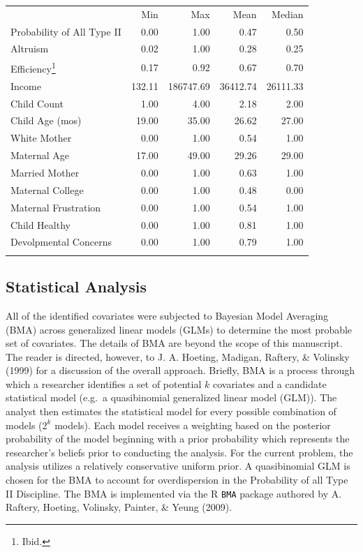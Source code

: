 \documentclass[review]{elsarticle}\usepackage[]{graphicx}\usepackage[]{color}
\begin{document}
\begin{longtable}[c]{@{}lrrrr@{}}
\toprule\addlinespace
& Min & Max & Mean & Median
\\\addlinespace
\midrule\endhead
Probability of All Type II & 0.00 & 1.00 & 0.47 & 0.50
\\\addlinespace
Altruism & 0.02 & 1.00 & 0.28 & 0.25
\\\addlinespace
Efficiency\footnote{Ibid.} & 0.17 & 0.92 & 0.67 & 0.70
\\\addlinespace
Income & 132.11 & 186747.69 & 36412.74 & 26111.33
\\\addlinespace
Child Count & 1.00 & 4.00 & 2.18 & 2.00
\\\addlinespace
Child Age (mos) & 19.00 & 35.00 & 26.62 & 27.00
\\\addlinespace
White Mother & 0.00 & 1.00 & 0.54 & 1.00
\\\addlinespace
Maternal Age & 17.00 & 49.00 & 29.26 & 29.00
\\\addlinespace
Married Mother & 0.00 & 1.00 & 0.63 & 1.00
\\\addlinespace
Maternal College & 0.00 & 1.00 & 0.48 & 0.00
\\\addlinespace
Maternal Frustration & 0.00 & 1.00 & 0.54 & 1.00
\\\addlinespace
Child Healthy & 0.00 & 1.00 & 0.81 & 1.00
\\\addlinespace
Devolpmental Concerns & 0.00 & 1.00 & 0.79 & 1.00
\\\addlinespace
\bottomrule
\end{longtable}

\subsection{Statistical Analysis}\label{statistical-analysis}

All of the identified covariates were subjected to Bayesian Model
Averaging (BMA) across generalized linear models (GLMs) to determine the
most probable set of covariates. The details of BMA are beyond the scope
of this manuscript. The reader is directed, however, to J. A. Hoeting,
Madigan, Raftery, \& Volinsky (1999) for a discussion of the overall
approach. Briefly, BMA is a process through which a researcher
identifies a set of potential $k$ covariates and a candidate statistical
model (e.g.~a quasibinomial generalized linear model (GLM)). The analyst
then estimates the statistical model for every possible combination of
models ($2^k$ models). Each model receives a weighting based on the
posterior probability of the model beginning with a prior probability
which represents the researcher's beliefs prior to conducting the
analysis. For the current problem, the analysis utilizes a relatively
conservative uniform prior. A quasibinomial GLM is chosen for the BMA to
account for overdispersion in the Probability of all Type II Discipline.
The BMA is implemented via the R \texttt{BMA} package authored by A.
Raftery, Hoeting, Volinsky, Painter, \& Yeung (2009).
\end{document}
